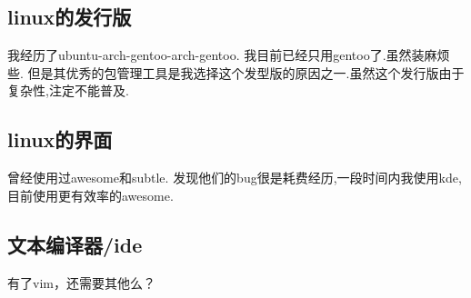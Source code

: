 \documentclass[titlepage]{article}
\begin{document}
\subsection{linux的发行版}

我经历了ubuntu-arch-gentoo-arch-gentoo. 我目前已经只用gentoo了.虽然装麻烦些. 但是其优秀的包管理工具是我选择这个发型版的原因之一.虽然这个发行版由于复杂性,注定不能普及.

\subsection{linux的界面}

曾经使用过awesome和subtle. 发现他们的bug很是耗费经历,一段时间内我使用kde,目前使用更有效率的awesome.

\subsection{文本编译器/ide}

有了{\color{red}vim}，还需要其他么？
\end{document}
